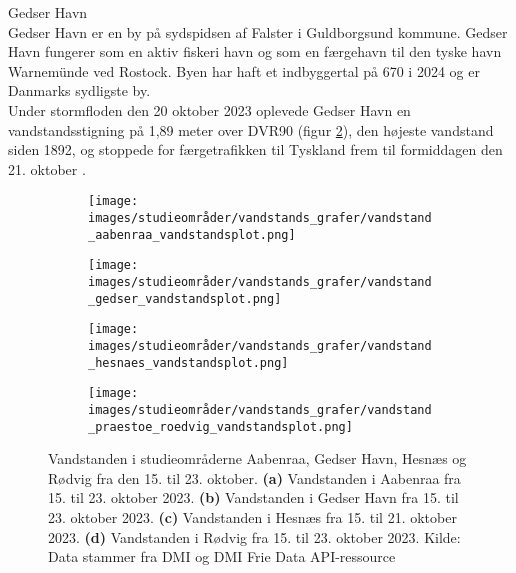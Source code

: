 {\large Gedser Havn}\\
Gedser Havn er en by på sydspidsen af Falster i Guldborgsund kommune. Gedser Havn fungerer som en aktiv fiskeri havn og som en færgehavn til den tyske havn Warnemünde ved Rostock. Byen har haft et indbyggertal på 670 i 2024 \citep{danmarks_statistisk_mobile_nodate} og er Danmarks sydligste by. \\
Under stormfloden den 20 oktober 2023 oplevede Gedser Havn en vandstandsstigning på 1,89 meter over DVR90 (figur \ref{Subfig: Gedser vandstand}), den højeste vandstand siden 1892, og stoppede for færgetrafikken til Tyskland frem til formiddagen den 21. oktober \citep{tiirikainen_sadan_2023}. \\
\begin{figure}[H]
    \begin{subfigure}[b]{0.5\textwidth}
        \centering
        \texttt{[image: images/studieområder/vandstands\_grafer/vandstand\_aabenraa\_vandstandsplot.png]}
        \caption{}
        \label{Subfig: Aabenraa vandstand}
    \end{subfigure}
    \hspace{0.2cm}
    \begin{subfigure}[b]{0.5\textwidth}
        \centering
        \texttt{[image: images/studieområder/vandstands\_grafer/vandstand\_gedser\_vandstandsplot.png]}
        \caption{}
        \label{Subfig: Gedser vandstand}
    \end{subfigure}
    \vspace{0.2cm}
    \begin{subfigure}[b]{0.5\textwidth}
        \centering
        \texttt{[image: images/studieområder/vandstands\_grafer/vandstand\_hesnaes\_vandstandsplot.png]}
        \caption{}
        \label{Subfig: Hesnæs vandstand}
    \end{subfigure}
    \hspace{0.2cm}
    \begin{subfigure}[b]{0.5\textwidth}
        \centering
        \texttt{[image: images/studieområder/vandstands\_grafer/vandstand\_praestoe\_roedvig\_vandstandsplot.png]}
        \caption{}
        \label{Subfig: Rødvig vandstand}
    \end{subfigure}
    \caption{Vandstanden i studieområderne Aabenraa, Gedser Havn, Hesnæs og Rødvig fra den 15. til 23. oktober. \textbf{(a)} Vandstanden i Aabenraa fra 15. til 23. oktober 2023. \textbf{(b)} Vandstanden i Gedser Havn fra 15. til 23. oktober 2023. \textbf{(c)} Vandstanden i Hesnæs fra 15. til 21. oktober 2023. \textbf{(d)} Vandstanden i Rødvig fra 15. til 23. oktober 2023. Kilde: Data stammer fra DMI og DMI Frie Data API-ressource}
    \label{Figur: Vandstandsdata}
\end{figure}
